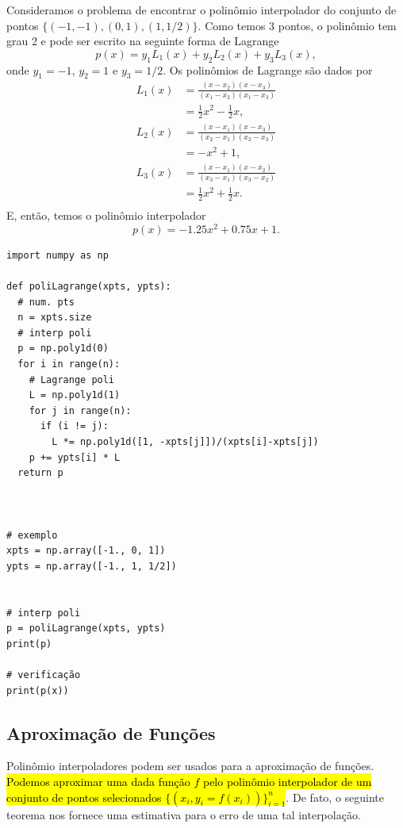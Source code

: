 \begin{ex}
  Consideramos o problema de encontrar o polinômio interpolador do conjunto de pontos $\{(-1, -1), (0, 1), (1, 1/2)\}$. Como temos 3 pontos, o polinômio tem grau 2 e pode ser escrito na seguinte forma de Lagrange
  \begin{equation}
    p(x) = y_1L_1(x) + y_2L_2(x) + y_3L_3(x),
  \end{equation}
  onde $y_1 = -1$, $y_2 = 1$ e $y_3 = 1/2$. Os polinômios de Lagrange são dados por
  \begin{align}
    L_1(x) &= \frac{(x-x_2)(x-x_3)}{(x_1-x_2)(x_1-x_3)} \\
           &= \frac{1}{2}x^2 - \frac{1}{2}x,\\
    L_2(x) &= \frac{(x-x_1)(x-x_3)}{(x_2-x_1)(x_2-x_3)} \\
           &= -x^2 + 1,\\
    L_3(x) &= \frac{(x-x_1)(x-x_2)}{(x_3-x_1)(x_3-x_2)} \\
           &= \frac{1}{2}x^2 + \frac{1}{2}x.\\
  \end{align}
  E, então, temos o polinômio interpolador
  \begin{equation}
    p(x) = -1.25x^2 + 0.75x + 1.
  \end{equation}

\begin{lstlisting}[caption=poliLagrange.py]
import numpy as np

def poliLagrange(xpts, ypts):
  # num. pts
  n = xpts.size
  # interp poli
  p = np.poly1d(0)
  for i in range(n):
    # Lagrange poli
    L = np.poly1d(1)
    for j in range(n):
      if (i != j):
        L *= np.poly1d([1, -xpts[j]])/(xpts[i]-xpts[j])
    p += ypts[i] * L
  return p



# exemplo
xpts = np.array([-1., 0, 1])
ypts = np.array([-1., 1, 1/2])


# interp poli
p = poliLagrange(xpts, ypts)
print(p)

# verificação
print(p(x))
\end{lstlisting}

\end{ex}

\subsection{Aproximação de Funções}

Polinômio interpoladores podem ser usados para a aproximação de funções. \hl{Podemos aproximar uma dada função $f$ pelo polinômio interpolador de um conjunto de pontos selecionados $\{(x_i, y_i=f(x_i))\}_{i=1}^n$}. De fato, o seguinte teorema nos fornece uma estimativa para o erro de uma tal interpolação.

